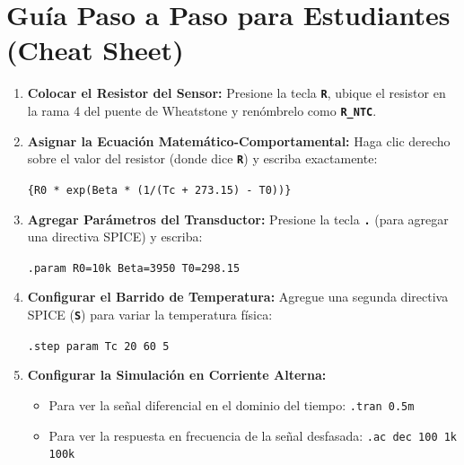 \documentclass[11pt,a4paper]{article}
\newcommand{\tecla}[1]{\colorbox{gray!20}{\texttt{\footnotesize\textbf{#1}}}}
\newcommand{\spice}[1]{\texttt{\color{purple}#1}}
\begin{document}
\newpage
\section{Guía Paso a Paso para Estudiantes (Cheat Sheet)}

\begin{enumerate}
    \item \textbf{Colocar el Resistor del Sensor:} Presione la tecla \tecla{R}, ubique el resistor en la rama 4 del puente de Wheatstone y renómbrelo como \tecla{R\_NTC}.
    \item \textbf{Asignar la Ecuación Matemático-Comportamental:} Haga clic derecho sobre el valor del resistor (donde dice \tecla{R}) y escriba exactamente:
    \begin{center}
        \spice{\{R0 * exp(Beta * (1/(Tc + 273.15) - T0))\}}
    \end{center}
    \item \textbf{Agregar Parámetros del Transductor:} Presione la tecla \tecla{.} (para agregar una directiva SPICE) y escriba:
    \begin{center}
        \spice{.param R0=10k Beta=3950 T0=298.15}
    \end{center}
    \item \textbf{Configurar el Barrido de Temperatura:} Agregue una segunda directiva SPICE (\tecla{S}) para variar la temperatura física:
    \begin{center}
        \spice{.step param Tc 20 60 5}
    \end{center}
    \item \textbf{Configurar la Simulación en Corriente Alterna:}
    \begin{itemize}[label=$\bullet$]
        \item Para ver la señal diferencial en el dominio del tiempo: \spice{.tran 0.5m}
        \item Para ver la respuesta en frecuencia de la señal desfasada: \spice{.ac dec 100 1k 100k}
    \end{itemize}
\end{enumerate}
\end{document}
